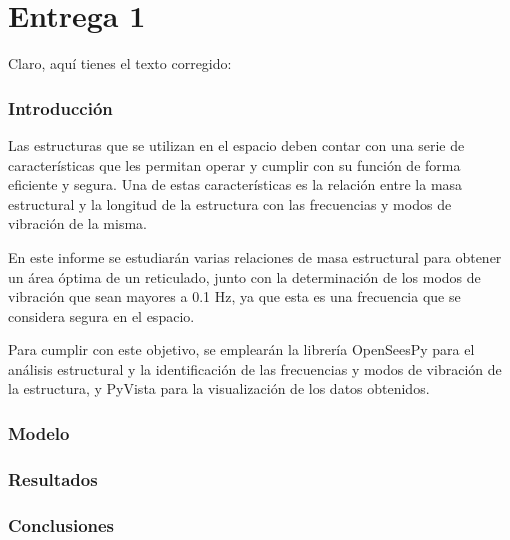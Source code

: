 \part{Entrega 1}
Claro, aquí tienes el texto corregido:

\section{Introducción}
Las estructuras que se utilizan en el espacio deben contar con una serie de características que les permitan operar y cumplir con su función de forma eficiente y segura. Una de estas características es la relación entre la masa estructural y la longitud de la estructura con las frecuencias y modos de vibración de la misma.

En este informe se estudiarán varias relaciones de masa estructural para obtener un área óptima de un reticulado, junto con la determinación de los modos de vibración que sean mayores a 0.1 Hz, ya que esta es una frecuencia que se considera segura en el espacio.

Para cumplir con este objetivo, se emplearán la librería OpenSeesPy para el análisis estructural y la identificación de las frecuencias y modos de vibración de la estructura, y PyVista para la visualización de los datos obtenidos.
\section{Modelo}

\section{Resultados}

\section{Conclusiones}